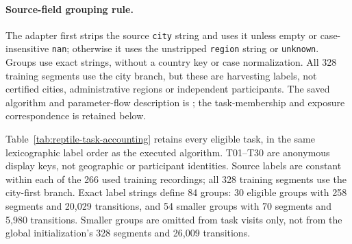 \paragraph{Source-field grouping rule.}
The adapter first strips the source \texttt{city} string and uses it unless
empty or case-insensitive \texttt{nan}; otherwise it uses the unstripped
\texttt{region} string or \texttt{unknown}. Groups use exact strings, without
a country key or case normalization. All 328 training segments use the city
branch, but these are harvesting labels, not certified cities, administrative
regions or independent participants.
The saved algorithm and parameter-flow description is
; the task-membership
and exposure correspondence is retained below.

Table~\ref{tab:reptile-task-accounting} retains every eligible task, in the
same lexicographic label order as the executed algorithm. T01--T30 are
anonymous display keys, not geographic or participant identities.
Source labels are constant within each of the 266 used training recordings;
all 328 training segments use the city-first branch. Exact label strings
define 84 groups: 30 eligible groups with 258 segments and 20,029 transitions,
and 54 smaller groups with 70 segments and 5,980 transitions.
Smaller groups are omitted from task visits only, not from the global
initialization's 328 segments and 26,009 transitions.

